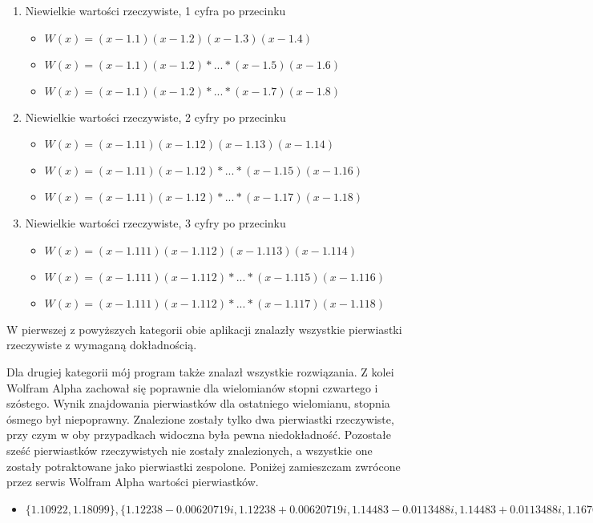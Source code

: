 \documentclass[oneside,a4paper]{book}
\begin{document}
	\begin{enumerate}
		\item Niewielkie wartości rzeczywiste, 1 cyfra po przecinku
		\begin{itemize}
			\item $W(x)=(x-1.1)(x-1.2)(x-1.3)(x-1.4)$
			\item $W(x)=(x-1.1)(x-1.2)*...*(x-1.5)(x-1.6)$
			\item $W(x)=(x-1.1)(x-1.2)*...*(x-1.7)(x-1.8)$
		\end{itemize}
		\item Niewielkie wartości rzeczywiste, 2 cyfry po przecinku
		\begin{itemize}
			\item $W(x)=(x-1.11)(x-1.12)(x-1.13)(x-1.14)$
			\item $W(x)=(x-1.11)(x-1.12)*...*(x-1.15)(x-1.16)$
			\item $W(x)=(x-1.11)(x-1.12)*...*(x-1.17)(x-1.18)$
		\end{itemize}
		\item Niewielkie wartości rzeczywiste, 3 cyfry po przecinku
		\begin{itemize}
			\item $W(x)=(x-1.111)(x-1.112)(x-1.113)(x-1.114)$
			\item $W(x)=(x-1.111)(x-1.112)*...*(x-1.115)(x-1.116)$
			\item $W(x)=(x-1.111)(x-1.112)*...*(x-1.117)(x-1.118)$
		\end{itemize}
	\end{enumerate}
	
	W pierwszej z powyższych kategorii obie aplikacji znalazły wszystkie pierwiastki rzeczywiste z wymaganą dokładnością.
	
	Dla drugiej kategorii mój program także znalazł wszystkie rozwiązania. Z kolei Wolfram Alpha zachował się poprawnie dla wielomianów stopni czwartego i szóstego. Wynik znajdowania pierwiastków dla ostatniego wielomianu, stopnia ósmego był niepoprawny. Znalezione zostały tylko dwa pierwiastki rzeczywiste, przy czym w oby przypadkach widoczna była pewna niedokładność. Pozostałe sześć pierwiastków rzeczywistych nie zostały znalezionych, a wszystkie one zostały potraktowane jako pierwiastki zespolone. Poniżej zamieszczam zwrócone przez serwis Wolfram Alpha wartości pierwiastków.
	
	\begin{itemize}
		\item $\{1.10922, 1.18099\}, \{1.12238-0.00620719i, 1.12238+0.00620719i, 1.14483-0.0113488i, 1.14483+0.0113488i, 1.16769-0.00684386 i, 1.16769+0.00684386i\}$
	\end{itemize}
	
\end{document}
